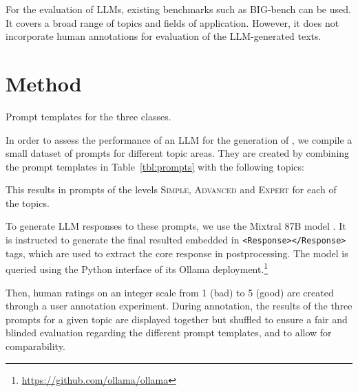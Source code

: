 \documentclass[11pt]{article}
\begin{document}
For the evaluation of LLMs, existing benchmarks such as BIG-bench \cite{srivastava2023} can be used. It covers a broad range of topics and fields of application. However, it does not incorporate human annotations for evaluation of the LLM-generated texts.

\section{Method}

\begin{table}\centering\small
  \caption{Prompt templates for the three classes.}
  \label{tbl:prompts}
\end{table}

In order to assess the performance of an LLM for the generation of , we compile a small dataset of prompts for different topic areas. They are created by combining the prompt templates in Table~\ref{tbl:prompts} with the following topics:

\begin{itemize}[nosep]
  \begin{multicols}{2}
\end{multicols}
\end{itemize}


This results in prompts of the levels \textsc{Simple}, \textsc{Advanced} and \textsc{Expert} for each of the topics.

To generate LLM responses to these prompts, we use the Mixtral 8\texttimes 7B model \cite{jiang2024}. It is instructed to generate the final resulted embedded in \texttt{\textless{}Response\textgreater{}\textless{}/Response\textgreater{}} tags, which are used to extract the core response in postprocessing. The model is queried using the Python interface of its Ollama deployment.\footnote{\url{https://github.com/ollama/ollama}}

Then, human ratings on an integer scale from 1 (bad) to 5 (good) are created through a user annotation experiment. During annotation, the results of the three prompts for a given topic are displayed together but shuffled to ensure a fair and blinded evaluation regarding the different prompt templates, and to allow for comparability.
\end{document}
